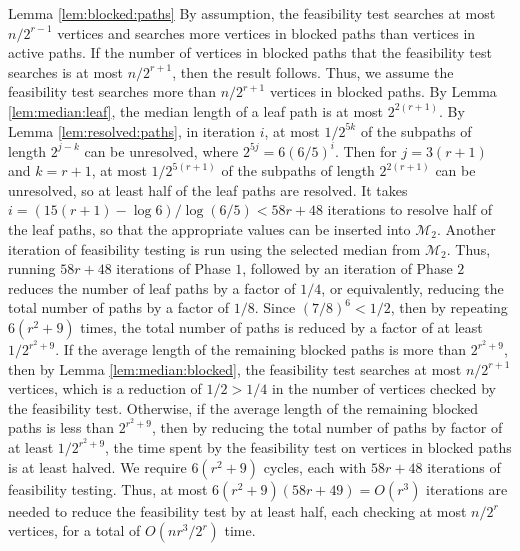 \documentclass[12pt]{article}
\begin{document}
\begin{spacing}{3}
\begin{proofof}{Lemma \ref{lem:blocked:paths}}
By assumption, the feasibility test searches at most $n/2^{r-1}$ vertices and searches more vertices in blocked paths than vertices in active paths. If the number of vertices in blocked paths that the feasibility test searches is at most $n/2^{r+1}$, then the result follows. Thus, we assume the feasibility test searches more than $n/2^{r+1}$ vertices in blocked paths.
\vskip 0.2in\noindent 
By Lemma \ref{lem:median:leaf}, the median length of a leaf path is at most $2^{2(r+1)}$. By Lemma \ref{lem:resolved:paths}, in iteration $i$, at most $1/2^{5k}$ of the subpaths of length $2^{j-k}$ can be unresolved, where $2^{5j}=6(6/5)^i$. Then for $j=3(r+1)$ and $k=r+1$, at most $1/2^{5(r+1)}$ of the subpaths of length $2^{2(r+1)}$ can be unresolved, so at least half of the leaf paths are resolved. It takes $i=(15(r+1)-\log 6)/\log(6/5)<58r+48$ iterations to resolve half of the leaf paths, so that the appropriate values can be inserted into $\mathcal{M}_2$. Another iteration of feasibility testing is run using the selected median from $\mathcal{M}_2$. Thus, running $58r+48$ iterations of Phase $1$, followed by an iteration of Phase $2$ reduces the number of leaf paths by a factor of $1/4$, or equivalently, reducing the total number of paths by a factor of $1/8$.
\vskip 0.2in\noindent
Since $(7/8)^6<1/2$, then by repeating $6(r^2+9)$ times, the total number of paths is reduced by a factor of at least $1/2^{r^2+9}$. If the average length of the remaining blocked paths is more than $2^{r^2+9}$, then by Lemma \ref{lem:median:blocked}, the feasibility test searches at most $n/2^{r+1}$ vertices, which is a reduction of $1/2>1/4$ in the number of vertices checked by the feasibility test. Otherwise, if the average length of the remaining blocked paths is less than $2^{r^2+9}$, then by reducing the total number of paths by factor of at least $1/2^{r^2+9}$, the time spent by the feasibility test on vertices in blocked paths is at least halved. We require $6(r^2+9)$ cycles, each with $58r+48$ iterations of feasibility testing. Thus, at most $6(r^2+9)(58r+49)=O(r^3)$ iterations are needed to reduce the feasibility test by at least half, each checking at most $n/2^r$ vertices, for a total of $O(nr^3/2^r)$ time.
\end{proofof}
\end{spacing}
\end{document}
